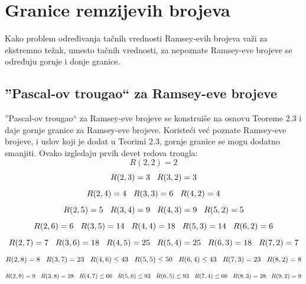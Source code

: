\documentclass[12pt,a4paper]{article}
\begin{document}
	\newpage
	\section{Granice remzijevih brojeva}
	Kako problem određivanja tačnih vrednosti Ramsey-evih brojeva važi za ekstremno težak, umesto tačnih vrednosti, za nepoznate Ramsey-eve brojeve se određuju gornje i donje granice.
	\subsection{''Pascal-ov trougao`` za  Ramsey-eve brojeve}
	''Pascal-ov trougao`` za  Ramsey-eve brojeve se konstruiše na osnovu Teoreme 2.3 i daje gornje granice za Ramsey-eve brojeve. Koristeći već poznate Ramsey-eve brojeve, i uslov koji je dodat u Teorimi 2.3, gornje granice se mogu dodatno smanjiti.
	\vspace{0.2em}
	\noindent Ovako izgledaju prvih devet redova trougla:
	\vspace{0.5em}
	\tiny 
\[R(2,2)=2\]
\[R(2,3)=3\hspace{0.3cm}R(3,2)=3\]
\[R(2,4)=4\hspace{0.3cm}R(3,3)=6\hspace{0.3cm}R(4,2)=4\]
\[R(2,5)=5\hspace{0.3cm}R(3,4)=9\hspace{0.3cm}R(4,3)=9\hspace{0.3cm}R(5,2)=5\]
\[R(2,6)=6\hspace{0.3cm}R(3,5)=14\hspace{0.3cm}R(4,4)=18\hspace{0.3cm}R(5,3)=14\hspace{0.3cm}R(6,2)=6\]
\[R(2,7)=7\hspace{0.3cm}R(3,6)=18\hspace{0.3cm}R(4,5)=25\hspace{0.3cm}R(5,4)=25\hspace{0.3cm}R(6,3)=18\hspace{0.3cm}R(7,2)=7\]
\[R(2,8)=8\hspace{0.3cm}R(3,7)=23\hspace{0.3cm}R(4,6)\leq 43\hspace{0.3cm}R(5,5)\leq 50\hspace{0.3cm}R(6,4)\leq 43\hspace{0.3cm}R(7,3)=23\hspace{0.3cm}R(8,2)=8\]
\[R(2,9)=9\hspace{0.3cm}R(3,8)=28\hspace{0.3cm}R(4,7)\leq 66\hspace{0.3cm}R(5,6)\leq 93\hspace{0.3cm}R(6,5)\leq 93\hspace{0.3cm}R(7,4)\leq 66\hspace{0.3cm}R(8,3)=28\hspace{0.3cm}R(9,2)=9\]
\end{document}
